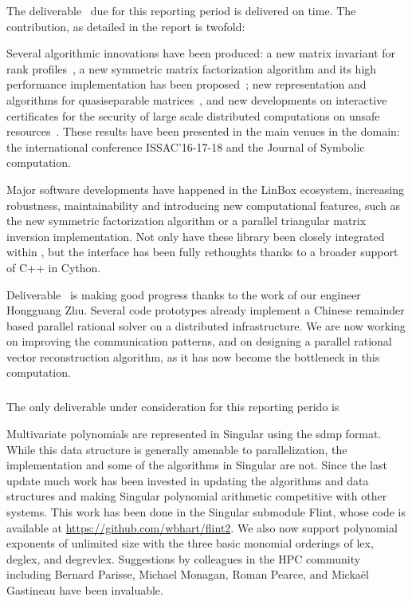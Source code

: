 The deliverable~ due for this reporting period is
delivered on time. The contribution, as detailed in the report is twofold:
\begin{compactitem}
\item Several algorithmic innovations have been produced: a new matrix invariant
  for rank profiles~\cite{DumPerSul:fcrpmgbd16}, a new symmetric matrix
  factorization algorithm and its high performance implementation has been
  proposed~\cite{DuPe18}; new representation and algorithms for quasiseparable
  matrices~\cite{Pernet:cqm16,PerSto:tsegqm17}, and new developments on 
  interactive certificates for the security of large scale distributed
  computations on unsafe
  resources~\cite{DumKalTho:lticmpdsm16,DumLucPer:cftearp17}. These results have been
  presented in the main venues in the domain:
  the international conference ISSAC'16-17-18 and the Journal of Symbolic computation.
\item Major software developments have happened in the LinBox ecosystem, increasing
  robustness, maintainability and introducing new computational features, such
  as the new symmetric factorization algorithm or a parallel triangular matrix
  inversion implementation. Not only have these library been closely integrated
  within \Sage, but the interface has been fully rethoughts thanks to a broader
  support of C++ in Cython.
\end{compactitem}


Deliverable~ is making good progress
  thanks to the work of our \ODK engineer Hongguang Zhu. Several code prototypes
  already implement a Chinese remainder based parallel rational solver on a distributed
  infrastructure. We are now working on improving the communication patterns,
  and on designing a parallel rational vector reconstruction algorithm, as it
  has now become the bottleneck in this computation.
  
  \subparagraph{}

  The only deliverable under consideration for this reporting perido
  is~

Multivariate polynomials are represented in Singular using the sdmp format. While this data structure is generally amenable to parallelization, the implementation and some of the algorithms in Singular are not. Since the last update much work has been invested in updating the algorithms and data structures and making Singular polynomial arithmetic competitive with other systems. This work has been done in the Singular submodule Flint, whose code is available at \url{https://github.com/wbhart/flint2}. We also now support polynomial exponents of unlimited size with the three basic monomial orderings of lex, deglex, and degrevlex. Suggestions by colleagues in the HPC community including Bernard Parisse, Michael Monagan, Roman Pearce, and Micka\"el Gastineau have been invaluable.

